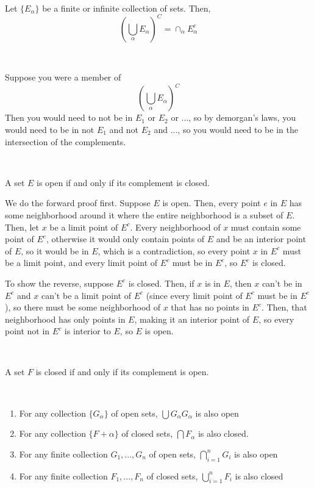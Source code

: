 \documentclass{article}
\begin{document}
\begin{theorem}
\

Let $\{E_\alpha\}$ be a finite or infinite collection of sets. Then, $$(\bigcup_\alpha E_\alpha)^C = \cap_\alpha E_\alpha^c$$
\end{theorem}

\begin{customproof}
\

Suppose you were a member of $$(\bigcup_\alpha E_\alpha)^C$$Then you would need to not be in $E_1$ or $E_2$ or ..., so by demorgan's laws, you would need to be in not $E_1$ and not $E_2$ and ..., so you would need to be in the intersection of the complements.
\end{customproof}

\begin{theorem}
\

A set $E$ is open if and only if its complement is closed.
\end{theorem}

We do the forward proof first. Suppose $E$ is open. Then, every point $e$ in $E$ has some neighborhood around it where the entire neighborhood is a subset of $E$. Then, let $x$ be a limit point of $E^c$. Every neighborhood of $x$ must contain some point of $E^c$, otherwise it would only contain points of $E$ and be an interior point of $E$, so it would be in $E$, which is a contradiction, so every point $x$ in $E^c$ must be a limit point, and every limit point of $E^c$ must be in $E^c$, so $E^c$ is closed.

To show the reverse, suppose $E^c$ is closed. Then, if $x$ is in $E$, then $x$ can't be in $E^c$ and $x$ can't be a limit point of $E^c$ (since every limit point of $E^c$ must be in $E^c$), so there must be some neighborhood of $x$ that has no points in $E^c$. Then, that neighborhood has only points in $E$, making it an interior point of $E$, so every point not in $E^c$ is interior to $E$, so $E$ is open.

\begin{corollary}
\

A set $F$ is closed if and only if its complement is open.
\end{corollary}

\begin{theorem}
\

\begin{enumerate}
    \item For any collection $\{G_\alpha\}$ of open sets, $\bigcup G_\alpha G_\alpha$ is also open
    \item For any collection $\{F+\alpha\}$ of closed sets, $\bigcap F_\alpha$ is also closed.
    \item For any finite collection $G_1, ..., G_n$ of open sets, $\bigcap_{i=1}^n G_i$ is also open
    \item For any finite collection $F_1, ..., F_n$ of closed sets, $\bigcup_{i=1}^n F_i$ is also closed
\end{enumerate}
\end{theorem}
\end{document}
